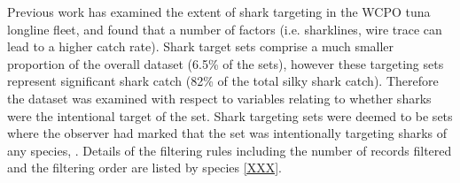 Previous work \citep{Rice2012_a, Rice2013_a, Bromhead et al 1012} has examined the extent of shark targeting in the WCPO tuna longline fleet, and found that a number of factors (i.e. sharklines, wire trace can lead to a higher catch rate). Shark target sets comprise a much smaller proportion of the overall dataset (6.5\% of the sets), however these targeting sets represent significant shark catch (82\% of the total silky shark catch). Therefore the dataset was examined with respect to variables relating to whether sharks were the intentional target of the set.                                                                                      
Shark targeting sets were deemed to be sets where the observer had marked that the set was intentionally targeting sharks of any species, . %
Details of the  filtering rules including the number of records filtered and the filtering  order    are listed by species  \ref{XXX}. 
                                                                                       
                                                                                       
